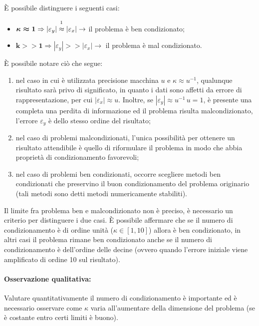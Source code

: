 È possibile distinguere i seguenti casi:
\begin{itemize}
	\item $\boldsymbol{\kappa\approx 1}\Rightarrow |\varepsilon_y|\overset{\footnotemark}{\approx}|\varepsilon_x|\rightarrow$ il problema è ben condizionato;
	\item $\boldsymbol{k>>1}\Rightarrow |\varepsilon_y|>>|\varepsilon_x|\rightarrow$ il problema è mal condizionato.
\end{itemize}


È possibile notare ciò che segue:
\begin{enumerate}
	\item nel caso in cui è utilizzata precisione macchina $u$ e $\kappa\approx u^{-1}$, qualunque risultato sarà privo di significato, in quanto i dati sono affetti da errore di rappresentazione, per cui $|\varepsilon_x|\approx u$. Inoltre, se $|\varepsilon_y|\approx u^{-1}\,u=1$, è presente una completa una perdita di informazione ed il problema risulta malcondizionato, l'errore $\varepsilon_y$ è dello stesso ordine del risultato;
	\item nel caso di problemi malcondizionati, l'unica possibilità per ottenere un risultato attendibile è quello di riformulare il problema in modo che abbia proprietà di condizionamento favorevoli;
	\item nel caso di problemi ben condizionati, occorre scegliere metodi ben condizionati che preservino il buon condizionamento del problema originario (tali metodi sono detti metodi numericamente stabiliti).
\end{enumerate}

Il limite fra problema ben e malcondizionato non è preciso, è necessario un criterio per distinguere i due casi. È possibile affermare che se il numero di condizionamento è di ordine unità ($\kappa\in[1,10]$) allora è ben condizionato, in altri casi il problema rimane ben condizionato anche se il numero di condizionamento è dell'ordine delle decine (ovvero quando l'errore iniziale viene amplificato di ordine 10 sul risultato).

\paragraph{Osservazione qualitativa:} Valutare quantitativamente il numero di condizionamento è importante ed è necessario osservare come $\kappa$ varia all'aumentare della dimensione del problema (se è costante entro certi limiti è buono).

